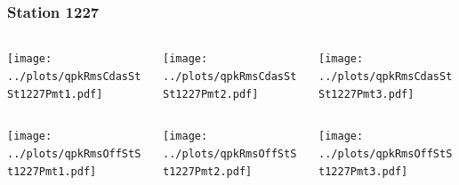 \documentclass[aspectratio=169]{beamer}
\begin{document}
\begin{frame} 
  \frametitle{Station 1227}
  \begin{center}
    \begin{columns}
      \begin{column}{0.33\textwidth}
        \texttt{[image: ../plots/qpkRmsCdasStSt1227Pmt1.pdf]}
      \end{column}
      \begin{column}{0.33\textwidth}
        \texttt{[image: ../plots/qpkRmsCdasStSt1227Pmt2.pdf]}
      \end{column}
      \begin{column}{0.33\textwidth}
        \texttt{[image: ../plots/qpkRmsCdasStSt1227Pmt3.pdf]}
      \end{column}
    \end{columns}
  \end{center}

  \begin{center}
    \begin{columns}
      \begin{column}{0.33\textwidth}
        \texttt{[image: ../plots/qpkRmsOffStSt1227Pmt1.pdf]}
      \end{column}
      \begin{column}{0.33\textwidth}
        \texttt{[image: ../plots/qpkRmsOffStSt1227Pmt2.pdf]}
      \end{column}
      \begin{column}{0.33\textwidth}
        \texttt{[image: ../plots/qpkRmsOffStSt1227Pmt3.pdf]}
      \end{column}
    \end{columns}
  \end{center}
\end{frame}
\end{document}
